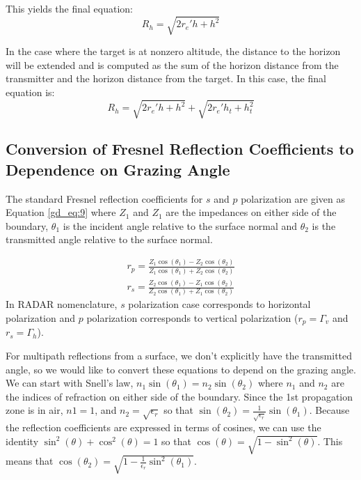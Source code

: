 \noindent This yields the final equation:
\begin{equation}
\label{gd_eq:8}
\boxed{R_h = \sqrt{2r_e'h + h^2}}
\end{equation}
\renewcommand{\baselinestretch}{2} \small\normalsize

In the case where the target is at nonzero altitude, the distance to the horizon will be extended and is computed as the sum of the horizon distance from the transmitter and the horizon distance from the target. In this case, the final equation is:
\begin{equation}
\label{gd_eq:8a}
\boxed{R_h = \sqrt{2r_e'h + h^2} + \sqrt{2r_e'h_t + h_t^2}}
\end{equation}
\renewcommand{\baselinestretch}{2} \small\normalsize

\subsection{Conversion of Fresnel Reflection Coefficients to Dependence on Grazing Angle}
The standard Fresnel reflection coefficients for $s$ and $p$ polarization are given as Equation \ref{gd_eq:9} \cite{zangwill_modern_em} where $Z_1$ and $Z_1$ are the impedances on either side of the boundary, $\theta_1$ is the incident angle relative to the surface normal and $\theta_2$ is the transmitted angle relative to the surface normal.

\begin{equation}
\begin{gathered}
\label{gd_eq:9}
r_p = \frac{Z_1\cos(\theta_1) - Z_2\cos(\theta_2)}{Z_1\cos(\theta_1) + Z_2\cos(\theta_2)} \\
r_s = \frac{Z_2\cos(\theta_1) - Z_1\cos(\theta_2)}{Z_2\cos(\theta_1) + Z_1\cos(\theta_2)}
\end{gathered}
\end{equation}
\renewcommand{\baselinestretch}{2} \small\normalsize
In RADAR nomenclature, $s$ polarization case corresponds to horizontal polarization and $p$ polarization corresponds to vertical polarization ($r_p = \Gamma_v$ and $r_s = \Gamma_h$).

For multipath reflections from a surface, we don't explicitly have the transmitted angle, so we would like to convert these equations to depend on the grazing angle. We can start with Snell's law, $n_1\sin(\theta_1) = n_2\sin(\theta_2)$ where $n_1$ and $n_2$ are the indices of refraction on either side of the boundary. Since the 1st propagation zone is in air, $n1 = 1$, and $n_2 = \sqrt{\epsilon_r}$ so that $\sin(\theta_2) = \frac{1}{\sqrt{\epsilon_r}}\sin(\theta_1)$. Because the reflection coefficients are expressed in terms of cosines, we can use the identity $\sin^2(\theta) + \cos^2(\theta) = 1$ so that $\cos(\theta) = \sqrt{1 - \sin^2(\theta)}$. This means that $\cos(\theta_2) = \sqrt{1 - \frac{1}{\epsilon_r}\sin^2(\theta_1)}$.

